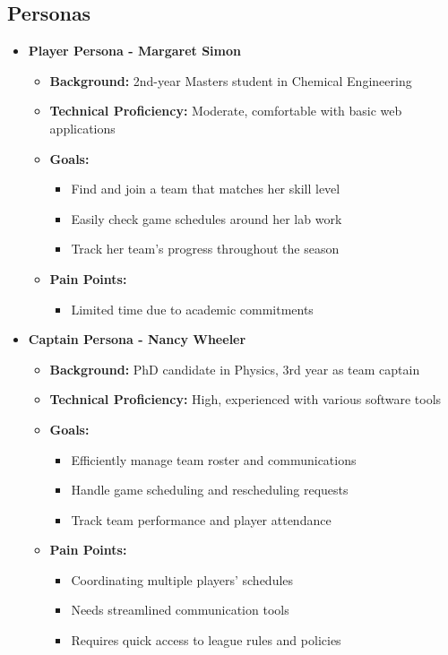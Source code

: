\documentclass[12pt, titlepage]{article}
\begin{document}
\subsection{Personas}
\begin{itemize}
    \item \textbf{Player Persona - Margaret Simon}
    \begin{itemize}
        \item \textbf{Background:} 2nd-year Masters student in Chemical Engineering
        \item \textbf{Technical Proficiency:} Moderate, comfortable with basic web applications
        \item \textbf{Goals:}
        \begin{itemize}
            \item Find and join a team that matches her skill level
            \item Easily check game schedules around her lab work
            \item Track her team's progress throughout the season
        \end{itemize}
        \item \textbf{Pain Points:}
        \begin{itemize}
            \item Limited time due to academic commitments
        \end{itemize}
    \end{itemize}

    \item \textbf{Captain Persona - Nancy Wheeler}
    \begin{itemize}
        \item \textbf{Background:} PhD candidate in Physics, 3rd year as team captain
        \item \textbf{Technical Proficiency:} High, experienced with various software tools
        \item \textbf{Goals:}
        \begin{itemize}
            \item Efficiently manage team roster and communications
            \item Handle game scheduling and rescheduling requests
            \item Track team performance and player attendance
        \end{itemize}
        \item \textbf{Pain Points:}
        \begin{itemize}
            \item Coordinating multiple players' schedules
            \item Needs streamlined communication tools
            \item Requires quick access to league rules and policies
        \end{itemize}
    \end{itemize}


\end{itemize}
\end{document}
